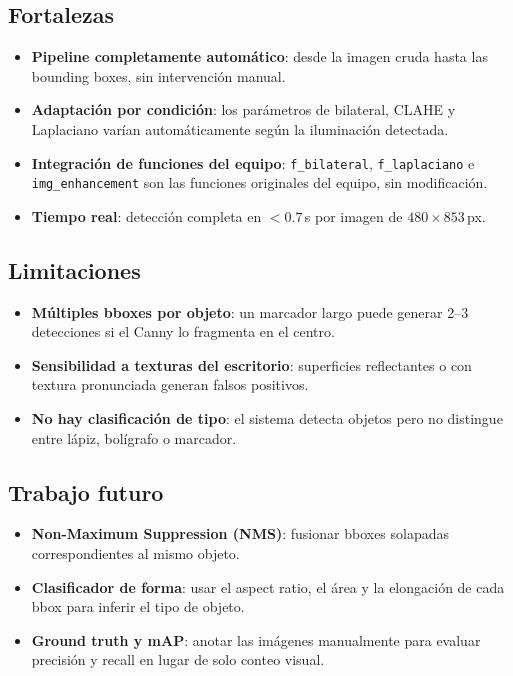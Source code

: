 \documentclass[11pt,a4paper]{article}
\begin{document}
\subsection{Fortalezas}
\begin{itemize}
    \item \textbf{Pipeline completamente automático}: desde la imagen cruda hasta
          las bounding boxes, sin intervención manual.
    \item \textbf{Adaptación por condición}: los parámetros de bilateral, CLAHE y
          Laplaciano varían automáticamente según la iluminación detectada.
    \item \textbf{Integración de funciones del equipo}: \texttt{f\_bilateral},
          \texttt{f\_laplaciano} e \texttt{img\_enhancement} son las funciones
          originales del equipo, sin modificación.
    \item \textbf{Tiempo real}: detección completa en $<0.7$\,s por imagen
          de $480\times853$\,px.
\end{itemize}

\subsection{Limitaciones}
\begin{itemize}
    \item \textbf{Múltiples bboxes por objeto}: un marcador largo puede generar
          2--3 detecciones si el Canny lo fragmenta en el centro.
    \item \textbf{Sensibilidad a texturas del escritorio}: superficies reflectantes
          o con textura pronunciada generan falsos positivos.
    \item \textbf{No hay clasificación de tipo}: el sistema detecta objetos pero no
          distingue entre lápiz, bolígrafo o marcador.
\end{itemize}

\subsection{Trabajo futuro}
\begin{itemize}
    \item \textbf{Non-Maximum Suppression (NMS)}: fusionar bboxes solapadas
          correspondientes al mismo objeto.
    \item \textbf{Clasificador de forma}: usar el aspect ratio, el área y la
          elongación de cada bbox para inferir el tipo de objeto.
    \item \textbf{Ground truth y mAP}: anotar las imágenes manualmente para evaluar
          precisión y recall en lugar de solo conteo visual.
\end{itemize}
\end{document}
